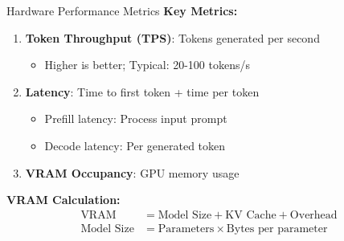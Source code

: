 \documentclass[aspectratio=169,10pt]{beamer}
\begin{document}
\begin{frame}{Hardware Performance Metrics}
    \textbf{Key Metrics:}

    \vspace{0.3cm}
    \begin{enumerate}
        \item \textbf{Token Throughput (TPS)}: Tokens generated per second
        \begin{itemize}
            \item Higher is better; Typical: 20-100 tokens/s
        \end{itemize}

        \item \textbf{Latency}: Time to first token + time per token
        \begin{itemize}
            \item Prefill latency: Process input prompt
            \item Decode latency: Per generated token
        \end{itemize}

        \item \textbf{VRAM Occupancy}: GPU memory usage
    \end{enumerate}

    \vspace{0.5cm}
    \textbf{VRAM Calculation:}
    \begin{align*}
        \text{VRAM} &= \text{Model Size} + \text{KV Cache} + \text{Overhead} \\
        \text{Model Size} &= \text{Parameters} \times \text{Bytes per parameter}
    \end{align*}
\end{frame}
\end{document}
